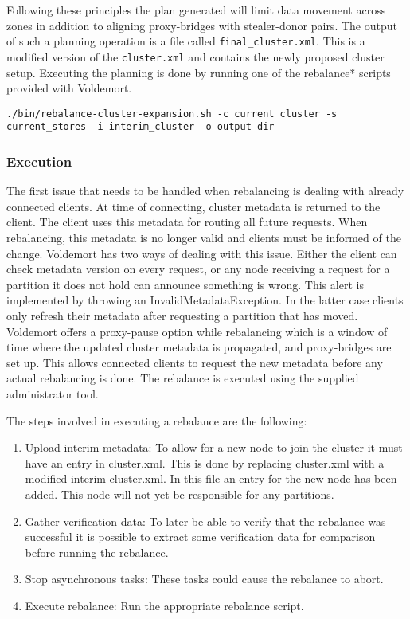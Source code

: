 Following these principles the plan generated will limit data movement across zones in addition to aligning proxy-bridges with stealer-donor pairs. The output of such a planning operation is a file called \texttt{final\_cluster.xml}. This is a modified version of the \texttt{cluster.xml} and contains the newly proposed cluster setup. Executing the planning is done by running one of the rebalance* scripts provided with Voldemort. 

\begin{lstlisting}[style=customc, caption=Sample command to plan a cluster expansion. Outputs a final\_cluster.xml as well as a plan]
./bin/rebalance-cluster-expansion.sh -c current_cluster -s current_stores -i interim_cluster -o output dir
\end{lstlisting}

\subsubsection{Execution}
The first issue that needs to be handled when rebalancing is dealing with already connected clients. At time of connecting, cluster metadata is returned to the client. The client uses this metadata for routing all future requests. When rebalancing, this metadata is no longer valid and clients must be informed of the change. Voldemort has two ways of dealing with this issue. Either the client can check metadata version on every request, or any node receiving a request for a partition it does not hold can announce something is wrong. This alert is implemented by throwing an InvalidMetadataException. In the latter case clients only refresh their metadata after requesting a partition that has moved. Voldemort offers a proxy-pause option while rebalancing which is a window of time where the updated cluster metadata is propagated, and proxy-bridges are set up. This allows connected clients to request the new metadata before any actual rebalancing is done. The rebalance is executed using the supplied administrator tool. 

The steps involved in executing a rebalance are the following:

\begin{enumerate}
\item Upload interim metadata: To allow for a new node to join the cluster it must have an entry in cluster.xml. This is done by replacing cluster.xml with a modified interim cluster.xml. In this file an entry for the new node has been added. This node will not yet be responsible for any partitions.
\item Gather verification data: To later be able to verify that the rebalance was successful it is possible to extract some verification data for comparison before running the rebalance.
\item Stop asynchronous tasks: These tasks could cause the rebalance to abort.
\item Execute rebalance: Run the appropriate rebalance script.
\end{enumerate}

